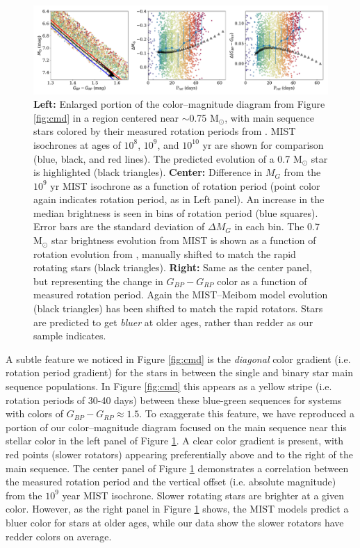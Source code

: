\documentclass[trackchanges,preprint2]{aastex62}
\begin{document}
\begin{figure}
\centering
\includegraphics[width=7in]{fig6}
\caption{
{\bf Left:} Enlarged portion of the color--magnitude diagram from Figure \ref{fig:cmd} in a region centered near $\sim$0.75 M$_\odot$, with main sequence stars colored by their measured rotation periods from \citet{mcquillan2014}.
MIST isochrones at ages of $10^8$, $10^9$, and $10^{10}$ yr are shown for comparison (blue, black, and red lines). The predicted evolution of a 0.7 M$_\odot$ star is highlighted (black triangles). 
{\bf Center:} Difference in $M_G$ from the $10^9$ yr MIST isochrone as a function of rotation period (point color again indicates rotation period, as in Left panel). An increase in the median brightness is seen in bins of rotation period (blue squares). Error bars are the standard deviation of $\Delta M_G$ in each bin. The 0.7 M$_\odot$ star brightness evolution from MIST is shown as a function of rotation evolution from \citet{meibom2009}, manually shifted to match the rapid rotating stars (black triangles).
{\bf Right:} Same as the center panel, but representing the change in $G_{BP}-G_{RP}$ color as a function of measured rotation period. Again the MIST--Meibom model evolution (black triangles) has been shifted to match the rapid rotators. Stars are predicted to get {\it bluer} at older ages, rather than redder as our sample indicates.
}
\label{fig:cmd_zoom}
\end{figure}

A subtle feature we noticed in Figure \ref{fig:cmd} is the {\it diagonal} color gradient (i.e. rotation period gradient) for the stars in between the single and binary star main sequence populations. In Figure \ref{fig:cmd} this appears as a yellow stripe (i.e. rotation periods of 30-40 days) between these blue-green sequences for systems with colors of $G_{BP} - G_{RP} \approx 1.5$. To exaggerate this feature, we have reproduced a portion of our color--magnitude diagram focused on the main sequence near this stellar color in the left panel of Figure \ref{fig:cmd_zoom}. A clear color gradient is present, with red points (slower rotators) appearing preferentially above and to the right of the main sequence.
The center panel of Figure \ref{fig:cmd_zoom} demonstrates a correlation between the measured rotation period and the vertical offset (i.e. absolute magnitude) from the $10^9$ year MIST isochrone. Slower rotating stars are brighter at a given color.
However, as the right panel in Figure \ref{fig:cmd_zoom} shows, the MIST models predict a bluer color for stars at older ages, while our data show the slower rotators have redder colors on average.
\end{document}
